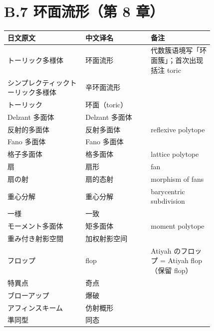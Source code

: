 \section*{B.7 环面流形（第 8 章）}
{\small
\begin{longtable}{p{0.31\linewidth} p{0.26\linewidth} p{0.25\linewidth}}
\toprule
日文原文 & 中文译名 & 备注 \\
\midrule
\endhead
トーリック多様体 & 环面流形 & 代数簇语境写「环面簇」；首次出现括注 toric \\
シンプレクティックトーリック多様体 & 辛环面流形 &  \\
トーリック & 环面（toric） &  \\
Delzant 多面体 & Delzant 多面体 &  \\
反射的多面体 & 反射多面体 & reflexive polytope \\
Fano 多面体 & Fano 多面体 &  \\
格子多面体 & 格多面体 & lattice polytope \\
扇 & 扇形 & fan \\
扇の射 & 扇的态射 & morphism of fans \\
重心分解 & 重心分解 & barycentric subdivision \\
一様 & 一致 &  \\
モーメント多面体 & 矩多面体 & moment polytope \\
重み付き射影空間 & 加权射影空间 &  \\
フロップ & flop & Atiyah のフロップ = Atiyah flop（保留 flop） \\
特異点 & 奇点 &  \\
ブローアップ & 爆破 &  \\
アフィンスキーム & 仿射概形 &  \\
準同型 & 同态 &  \\
\bottomrule
\end{longtable}
}

